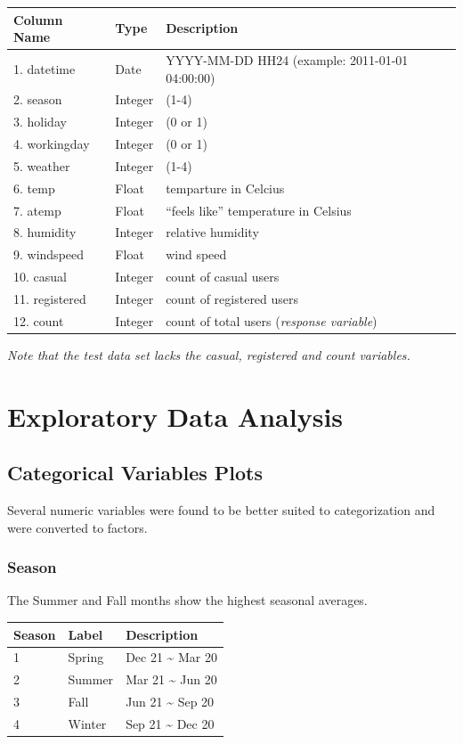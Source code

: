 \documentclass[american,]{article}
\begin{document}
\begin{longtable}[]{@{}lll@{}}
\toprule
Column Name & Type & Description\tabularnewline
\midrule
\endhead
1. datetime & Date & YYYY-MM-DD HH24 (example: 2011-01-01 04:00:00)\tabularnewline
2. season & Integer & (1-4)\tabularnewline
3. holiday & Integer & (0 or 1)\tabularnewline
4. workingday & Integer & (0 or 1)\tabularnewline
5. weather & Integer & (1-4)\tabularnewline
6. temp & Float & temparture in Celcius\tabularnewline
7. atemp & Float & ``feels like'' temperature in Celsius\tabularnewline
8. humidity & Integer & relative humidity\tabularnewline
9. windspeed & Float & wind speed\tabularnewline
10. casual & Integer & count of casual users\tabularnewline
11. registered & Integer & count of registered users\tabularnewline
12. count & Integer & count of total users (\emph{response variable})\tabularnewline
\bottomrule
\end{longtable}

\emph{Note that the test data set lacks the casual, registered and count variables.}

\newpage

\hypertarget{exploratory-data-analysis}{%
\section{Exploratory Data Analysis}\label{exploratory-data-analysis}}

\hypertarget{categorical-variables-plots}{%
\subsection{Categorical Variables Plots}\label{categorical-variables-plots}}

Several numeric variables were found to be better suited to categorization and were converted to factors.

\hypertarget{season}{%
\subsubsection{Season}\label{season}}

The Summer and Fall months show the highest seasonal averages.

\begin{longtable}[]{@{}lll@{}}
\toprule
Season & Label & Description\tabularnewline
\midrule
\endhead
1 & Spring & Dec 21 \textasciitilde{} Mar 20\tabularnewline
2 & Summer & Mar 21 \textasciitilde{} Jun 20\tabularnewline
3 & Fall & Jun 21 \textasciitilde{} Sep 20\tabularnewline
4 & Winter & Sep 21 \textasciitilde{} Dec 20\tabularnewline
\bottomrule
\end{longtable}
\end{document}
